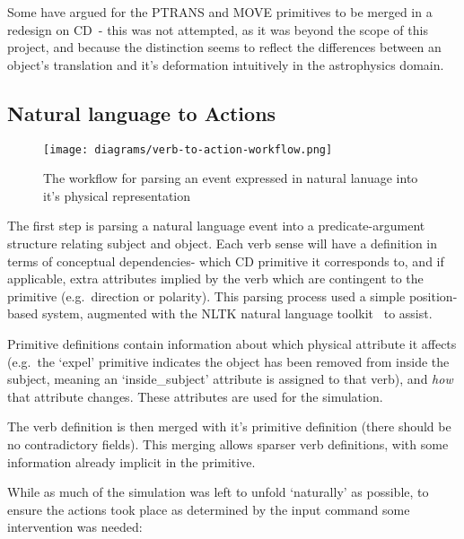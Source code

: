 \documentclass[dissertation.tex]{subfiles}
\begin{document}
    Some have argued for the PTRANS and MOVE primitives to be merged in a redesign on CD~\cite{macbethimage}- this was not attempted, as it was beyond the scope of this project, and because the distinction seems to reflect the differences between an object's translation and it's deformation intuitively in the astrophysics domain.

    \subsection{Natural language to Actions}

    \begin{figure}[h]
        \begin{center}
            \texttt{[image: diagrams/verb-to-action-workflow.png]}
        \end{center}
        \caption{The workflow for parsing an event expressed in natural lanuage into it's physical representation}
    \end{figure}

    The first step is parsing a natural language event into a predicate-argument structure relating subject and object. Each verb sense will have a definition in terms of conceptual dependencies- which CD primitive it corresponds to, and if applicable, extra attributes implied by the verb which are contingent to the primitive (e.g.~direction or polarity). This parsing process used a simple position-based system, augmented with the NLTK natural language toolkit~\cite{bird2009nltk} to assist.
    
    Primitive definitions contain information about which physical attribute it affects (e.g.~the `expel' primitive indicates the object has been removed from inside the subject, meaning an `inside\_subject' attribute is assigned to that verb), and \emph{how} that attribute changes. These attributes are used for the simulation.
    
    The verb definition is then merged with it's primitive definition (there should be no contradictory fields). This merging allows sparser verb definitions, with some information already implicit in the primitive.

    While as much of the simulation was left to unfold `naturally' as possible, to ensure the actions took place as determined by the input command some intervention was needed:
\end{document}
